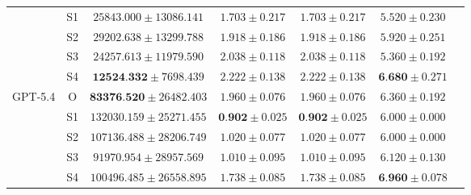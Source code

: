 \begin{table}[t]
\begin{center}
\begin{tabular}{lcccccc}
                 & S1 & $25843.000 \pm 13086.141$ & $1.703 \pm 0.217$ & $1.703 \pm 0.217$ & $5.520 \pm 0.230$ \\
                 & S2 & $29202.638 \pm 13299.788$ & $1.918 \pm 0.186$ & $1.918 \pm 0.186$ & $5.920 \pm 0.251$ \\
                 & S3 & $24257.613 \pm 11979.590$ & $2.038 \pm 0.118$ & $2.038 \pm 0.118$ & $5.360 \pm 0.192$ \\
                 & S4 & $\textbf{12524.332} \pm 7698.439$ & $2.222 \pm 0.138$ & $2.222 \pm 0.138$ & $\textbf{6.680} \pm 0.271$ \\

\addlinespace
GPT-5.4            & O & $\textbf{83376.520} \pm 26482.403$ & $1.960 \pm 0.076$ & $1.960 \pm 0.076$ & $6.360 \pm 0.192$ \\
                   & S1 & $132030.159 \pm 25271.455$ & $\textbf{0.902} \pm 0.025$ & $\textbf{0.902} \pm 0.025$ & $6.000 \pm 0.000$ \\
                   & S2 & $107136.488 \pm 28206.749$ & $1.020 \pm 0.077$ & $1.020 \pm 0.077$ & $6.000 \pm 0.000$ \\
                   & S3 & $91970.954 \pm 28957.569$ & $1.010 \pm 0.095$ & $1.010 \pm 0.095$ & $6.120 \pm 0.130$ \\
                   & S4 & $100496.485 \pm 26558.895$ & $1.738 \pm 0.085$ & $1.738 \pm 0.085$ & $\textbf{6.960} \pm 0.078$ \\
\bottomrule
\end{tabular}
\end{center}
\end{table}